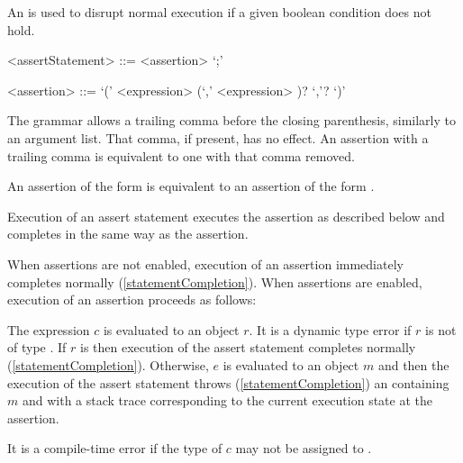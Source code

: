 \documentclass[makeidx]{article}
\begin{document}
{\LMHash{}%
An  is used to disrupt normal execution
if a given boolean condition does not hold.

\begin{grammar}
<assertStatement> ::= <assertion> `;'

<assertion> ::= \ASSERT{} `(' <expression> (`,' <expression> )? `,'? `)'
\end{grammar}

\LMHash{}%
The grammar allows a trailing comma before the closing parenthesis,
similarly to an argument list.
That comma, if present, has no effect.
An assertion with a trailing comma is equivalent to one with that comma removed.

\LMHash{}%
An assertion of the form  is equivalent to
an assertion of the form .

\LMHash{}%
Execution of an assert statement executes the assertion as described below
and completes in the same way as the assertion.

\LMHash{}%
When assertions are not enabled,
execution of an assertion immediately completes normally
(\ref{statementCompletion}).
When assertions are enabled,
execution of an assertion  proceeds as follows:

\LMHash{}%
The expression $c$ is evaluated to an object $r$.
It is a dynamic type error if $r$ is not of type .
If $r$ is \TRUE{} then execution of the assert statement completes normally
(\ref{statementCompletion}).
Otherwise, $e$ is evaluated to an object $m$
and then the execution of the assert statement throws
(\ref{statementCompletion})
an  containing $m$ and with
a stack trace corresponding to the current execution state at the assertion.

\LMHash{}%
It is a compile-time error if the type of $c$
may not be assigned to .



}
\end{document}
